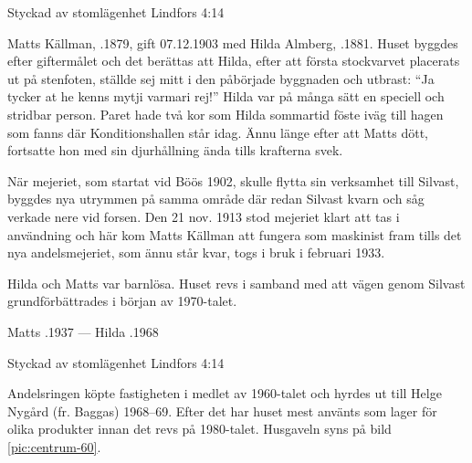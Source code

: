 %

Styckad av stomlägenhet Lindfors 4:14


%
Matts Källman, .1879, gift 07.12.1903 med Hilda Almberg, .1881. Huset byggdes efter giftermålet och det berättas att Hilda, efter att första stockvarvet placerats ut på stenfoten, ställde sej mitt i den påbörjade byggnaden och utbrast: ``Ja tycker at he kenns mytji varmari rej!'' Hilda var på många sätt en speciell och stridbar person. Paret hade två kor som Hilda sommartid föste iväg till hagen som fanns där Konditionshallen står idag. Ännu länge efter att Matts dött, fortsatte hon med sin djurhållning ända tills krafterna svek.

När mejeriet, som startat vid Böös 1902, skulle flytta sin verksamhet till Silvast, byggdes nya utrymmen på samma område där redan Silvast kvarn och såg verkade nere vid forsen. Den 21 nov. 1913 stod mejeriet klart att tas i användning och här kom Matts Källman att fungera som maskinist fram tills det nya andelsmejeriet, som ännu står kvar, togs i bruk i februari 1933.

Hilda och Matts var barnlösa. Huset revs i samband med att vägen genom Silvast grundförbättrades i början av 1970-talet.

Matts .1937  ---  Hilda .1968



%

Styckad av stomlägenhet Lindfors 4:14

%
Andelsringen köpte fastigheten i medlet av 1960-talet och hyrdes ut till Helge Nygård (fr. Baggas) 1968--69. Efter det har huset mest använts som lager för olika produkter innan det revs på 1980-talet. Husgaveln syns på bild \ref{pic:centrum-60}.


